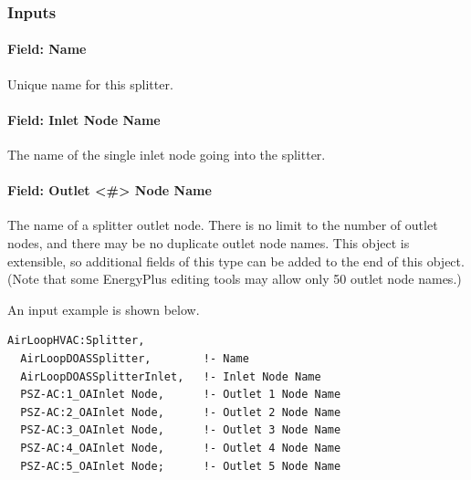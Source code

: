 \subsubsection{Inputs}\label{inputs-4-002}

\paragraph{Field: Name}\label{field-name-4-002}

Unique name for this splitter.

\paragraph{Field: Inlet Node Name}\label{field-inlet-node-name-2}

The name of the single inlet node going into the splitter.

\paragraph{Field: Outlet \textless{}\#\textgreater{} Node Name}\label{field-outlet-node-name-2}

The name of a splitter outlet node. There is no limit to the number of outlet nodes, and there may be no duplicate outlet node names.  This object is extensible, so additional fields of this type can be added to the end of this object.  (Note that some EnergyPlus editing tools may allow only 50 outlet node names.)

An input example is shown below.

\begin{lstlisting}
AirLoopHVAC:Splitter,
  AirLoopDOASSplitter,        !- Name
  AirLoopDOASSplitterInlet,   !- Inlet Node Name
  PSZ-AC:1_OAInlet Node,      !- Outlet 1 Node Name
  PSZ-AC:2_OAInlet Node,      !- Outlet 2 Node Name
  PSZ-AC:3_OAInlet Node,      !- Outlet 3 Node Name
  PSZ-AC:4_OAInlet Node,      !- Outlet 4 Node Name
  PSZ-AC:5_OAInlet Node;      !- Outlet 5 Node Name
\end{lstlisting}

